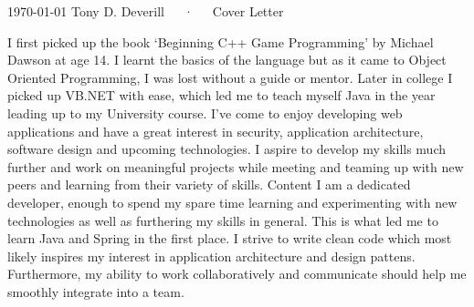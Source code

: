 \documentclass[11pt, a4paper]{awesome-cv}
\begin{document}
\makecvheader[R]

\makecvfooter
  {\today}
  {Tony D. Deverill~~~·~~~Cover Letter}
  {}

\makelettertitle

\begin{cvletter}

I first picked up the book `Beginning C++ Game Programming' by Michael Dawson at age 14. I learnt the basics of the language but as it came to Object Oriented Programming, I was lost without a guide or mentor. Later in college I picked up VB.NET with ease, which led me to teach myself Java in the year leading up to my University course. I've come to enjoy developing web applications and have a great interest in security, application architecture, software design and upcoming technologies. I aspire to develop my skills much further and work on meaningful projects while meeting and teaming up with new peers and learning from their variety of skills.
Content
I am a dedicated developer, enough to spend my spare time learning and experimenting with new technologies as well as furthering my skills in general. This is what led me to learn Java and Spring in the first place. I strive to write clean code which most likely inspires my interest in application architecture and design pattens. Furthermore, my ability to work collaboratively and communicate should help me smoothly integrate into a team.
\end{cvletter}


\makeletterclosing
\end{document}
